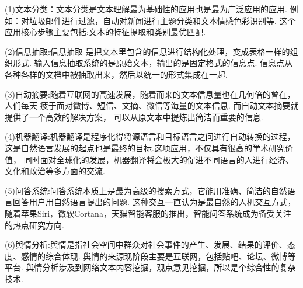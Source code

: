 \documentclass[bachelor,adobefonts]{jnuthesis}
\begin{document}
(1)文本分类：文本分类是文本理解最为基础性的应用也是最为广泛应用的应用.
例如：对垃圾邮件进行过滤，自动对新闻进行主题分类和文本情感色彩识别等.
这个应用核心步骤主要包括:文本的特征提取和类别最优匹配.

(2)信息抽取:信息抽取 是把文本里包含的信息进行结构化处理，变成表格一样的组织形式.
输入信息抽取系统的是原始文本，输出的是固定格式的信息点.
信息点从各种各样的文档中被抽取出来，然后以统一的形式集成在一起.

(3)自动摘要:随着互联网的高速发展，随着而来的文本信息量也在几何倍的曾在，人们每天
疲于面对微博、短信、文摘、微信等海量的文本信息.
而自动文本摘要就提供了一个高效的解决方案，
可以从原文本中提炼出简洁而重要的信息.

(4)机器翻译:机器翻译是程序化得将源语言和目标语言之间进行自动转换的过程，
这是自然语言发展的起点也是最终的目标.这项应用，不仅具有很高的学术研究价值，
同时面对全球化的发展，机器翻译将会极大的促进不同语言的人进行经济、文化和政治等多方面的交流.

(5)问答系统:问答系统本质上是最为高级的搜索方式，它能用准确、简洁的自然语言回答用户用自然语言提出的问题.
这种交互一直认为是最自然的人机交互方式，随着苹果Siri，微软Cortana，天猫智能客服的推出，智能问答系统成为备受关注的热点研究方向.

(6)舆情分析:舆情是指社会空间中群众对社会事件的产生、发展、结果的评价、态度、感情的综合体现.
舆情的来源现阶段主要是互联网，包括贴吧、论坛、微博等平台.
舆情分析涉及到网络文本内容挖掘，观点意见挖掘，所以是个综合性的复杂技术.
\end{document}
